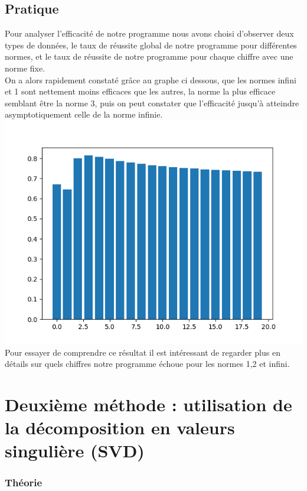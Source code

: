 \documentclass[a4paper,11pt,twoside]{report}
\begin{document}
\section{Pratique}
Pour analyser l'efficacité de notre programme nous avons choisi d'observer deux types de données, le taux de réussite global de notre programme pour différentes normes, et le taux de réussite de notre programme pour chaque chiffre avec une norme fixe.\\
On a alors rapidement constaté grâce au graphe ci dessous, que les normes infini et 1 sont nettement moins efficaces que les autres, la norme la plus efficace semblant être la norme 3, puis on peut constater que l'efficacité  jusqu'à atteindre asymptotiquement celle de la norme infinie.\\%
\includegraphics[scale=0.75]{Graphs/testNorme.png} \\

Pour essayer de comprendre ce résultat il est intéressant de regarder plus en détails sur quels chiffres notre programme échoue pour les normes 1,2 et infini.%



\chapter{Deuxième méthode : utilisation de la décomposition en valeurs singulière (SVD)}
\subsection{Théorie}
\end{document}
